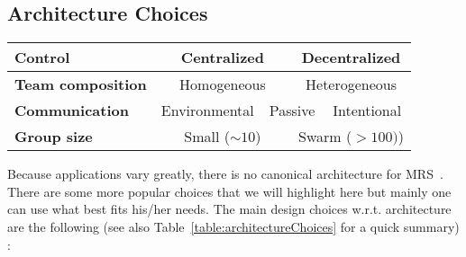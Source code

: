   \subsection{Architecture Choices}

    \begin{table*}[ht]
      \centerfloat
        \begin{tabular}{|l|c|c|c|c|c|c|}
          \hline
          \textbf{Control} & \multicolumn{3}{|c|}{Centralized} & \multicolumn{3}{|c|}{Decentralized} \\
          \hline
          \textbf{Team composition} & \multicolumn{3}{|c|}{Homogeneous} & \multicolumn{3}{|c|}{Heterogeneous} \\
          \hline
          \textbf{Communication} & \multicolumn{2}{|c|}{Environmental} & \multicolumn{2}{|c|}{Passive} & \multicolumn{2}{|c|}{Intentional} \\
          \hline
          \textbf{Group size} & \multicolumn{3}{|c|}{Small (\(\sim 10\))} & \multicolumn{3}{|c|}{Swarm (\(> 100)\))} \\
          \hline
        \end{tabular}
        \caption{\textbf{Architecture choices in multirobot systems.}}
      \label{table:architectureChoices}
    \end{table*}

    Because applications vary greatly, there is no canonical architecture for MRS~\parencite{Cao1997, Parker2008}. There are some more popular choices that we will highlight here but mainly one can use what best fits his/her needs. The main design choices w.r.t. architecture are the following (see also Table~\ref{table:architectureChoices} for a quick summary) :

